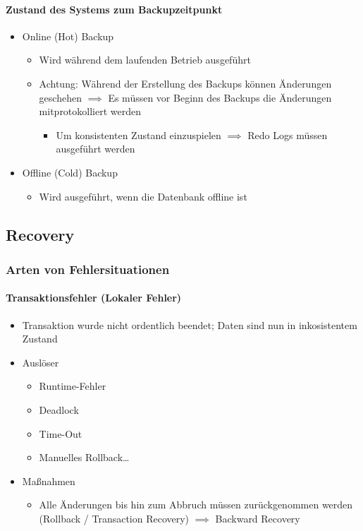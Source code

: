 \paragraph{Zustand des Systems zum Backupzeitpunkt}
\begin{itemize}
    \item Online (Hot) Backup
    \begin{itemize}
        \item Wird während dem laufenden Betrieb ausgeführt
        \item Achtung: Während der Erstellung des Backups können Änderungen geschehen $\implies$ Es müssen vor Beginn des Backups die Änderungen mitprotokolliert werden
        \begin{itemize}
            \item Um konsistenten Zustand einzuspielen $\implies$ Redo Logs müssen ausgeführt werden
        \end{itemize}
    \end{itemize}
    \item Offline (Cold) Backup
    \begin{itemize}
        \item Wird ausgeführt, wenn die Datenbank offline ist
    \end{itemize}
\end{itemize}

\subsection{Recovery}
\subsubsection{Arten von Fehlersituationen}

\paragraph{Transaktionsfehler (Lokaler Fehler)}
\begin{itemize}
    \item Transaktion wurde nicht ordentlich beendet; Daten sind nun in inkosistentem Zustand
    \item Auslöser
    \begin{itemize}
        \item Runtime-Fehler
        \item Deadlock
        \item Time-Out
        \item Manuelles Rollback\dots
    \end{itemize}
    \item Maßnahmen
    \begin{itemize}
        \item Alle Änderungen bis hin zum Abbruch müssen zurückgenommen werden (Rollback / Transaction Recovery) $\implies$ Backward Recovery 
    \end{itemize}
\end{itemize}


